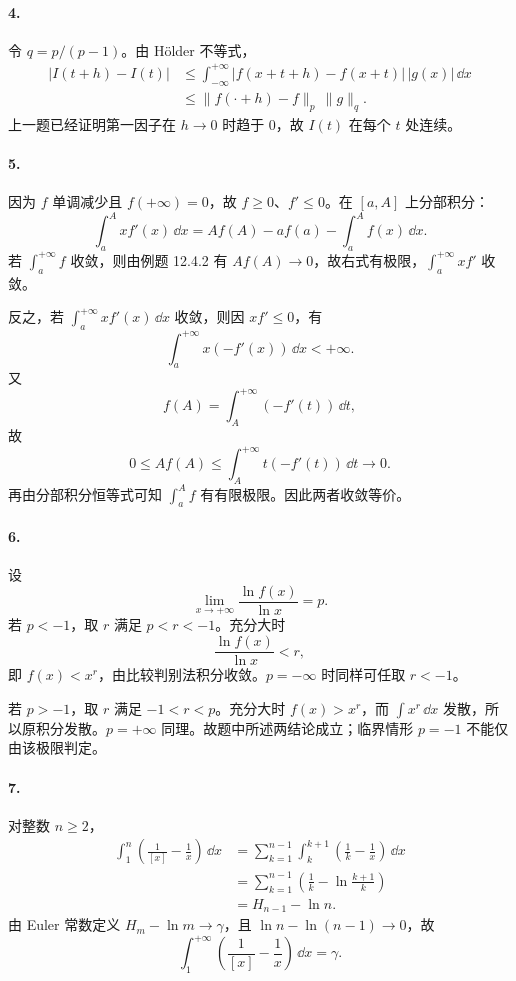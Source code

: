 \paragraph{4.}
令 $q=p/(p-1)$。由 H\"older 不等式，
\begin{align*}
  |I(t+h)-I(t)|
  &\leq\int_{-\infty}^{+\infty}|f(x+t+h)-f(x+t)|\,|g(x)|\,\dd x\\
  &\leq \|f(\cdot+h)-f\|_p\,\|g\|_q.
\end{align*}
上一题已经证明第一因子在 $h\to0$ 时趋于 $0$，故 $I(t)$ 在每个 $t$ 处连续。

\paragraph{5.}
因为 $f$ 单调减少且 $f(+\infty)=0$，故 $f\geq0$、$f'\leq0$。在 $[a,A]$ 上分部积分：
\[
  \int_a^A xf'(x)\,\dd x
  =Af(A)-af(a)-\int_a^A f(x)\,\dd x.
\]
若 $\int_a^{+\infty}f$ 收敛，则由例题 12.4.2 有 $Af(A)\to0$，故右式有极限，$\int_a^{+\infty}xf'$ 收敛。

反之，若 $\int_a^{+\infty}xf'(x)\,\dd x$ 收敛，则因 $xf'\leq0$，有
\[
  \int_a^{+\infty}x(-f'(x))\,\dd x<+\infty.
\]
又
\[
  f(A)=\int_A^{+\infty}(-f'(t))\,\dd t,
\]
故
\[
  0\leq Af(A)\leq\int_A^{+\infty}t(-f'(t))\,\dd t\to0.
\]
再由分部积分恒等式可知 $\int_a^A f$ 有有限极限。因此两者收敛等价。

\paragraph{6.}
设
\[
  \lim_{x\to+\infty}\frac{\ln f(x)}{\ln x}=p.
\]
若 $p<-1$，取 $r$ 满足 $p<r<-1$。充分大时
\[
  \frac{\ln f(x)}{\ln x}<r,
\]
即 $f(x)<x^r$，由比较判别法积分收敛。$p=-\infty$ 时同样可任取 $r<-1$。

若 $p>-1$，取 $r$ 满足 $-1<r<p$。充分大时 $f(x)>x^r$，而 $\int x^r\,\dd x$ 发散，所以原积分发散。$p=+\infty$ 同理。故题中所述两结论成立；临界情形 $p=-1$ 不能仅由该极限判定。

\paragraph{7.}
对整数 $n\geq2$，
\begin{align*}
  \int_1^n\left(\frac1{[x]}-\frac1x\right)\,\dd x
  &=\sum_{k=1}^{n-1}\int_k^{k+1}\left(\frac1k-\frac1x\right)\,\dd x\\
  &=\sum_{k=1}^{n-1}\left(\frac1k-\ln\frac{k+1}{k}\right)\\
  &=H_{n-1}-\ln n.
\end{align*}
由 Euler 常数定义 $H_m-\ln m\to\gamma$，且 $\ln n-\ln(n-1)\to0$，故
\[
  \boxed{\int_1^{+\infty}\left(\frac1{[x]}-\frac1x\right)\,\dd x=\gamma}.
\]

